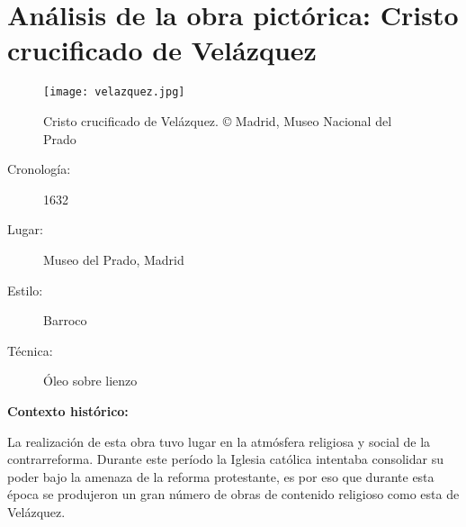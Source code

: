 \section{Análisis de la obra pictórica: Cristo crucificado de Velázquez } 

\begin{figure}[ht!]
    \centering
    \texttt{[image: velazquez.jpg]}
    \caption{Cristo crucificado de Velázquez. © Madrid, Museo Nacional del Prado} %
\end{figure}

\newpage



\begin{description}
\item[Cronología:] 1632
\item[Lugar:] Museo del Prado, Madrid
\item[Estilo:] Barroco
\item[Técnica:] Óleo sobre lienzo
\end{description}

\textbf{Contexto histórico:}

La realización de esta obra tuvo lugar en la atmósfera religiosa y social de la contrarreforma. Durante este período la Iglesia católica intentaba consolidar su poder bajo la amenaza de la reforma protestante, es por eso que durante esta época se produjeron un gran número de obras de contenido religioso como esta de Velázquez.

